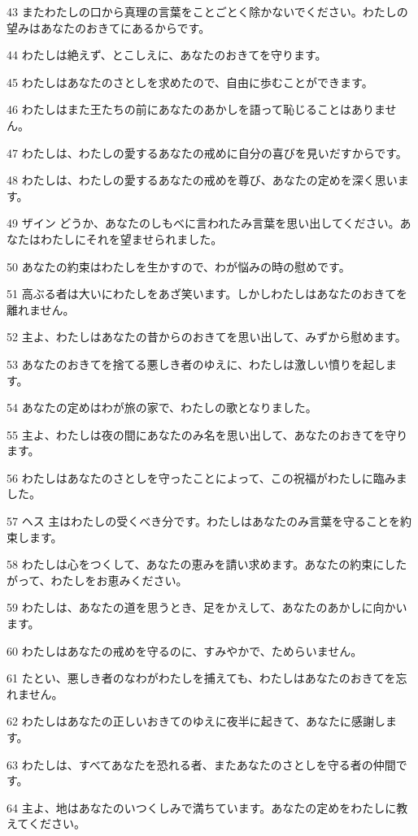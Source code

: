 \par 43 またわたしの口から真理の言葉をことごとく除かないでください。わたしの望みはあなたのおきてにあるからです。
\par 44 わたしは絶えず、とこしえに、あなたのおきてを守ります。
\par 45 わたしはあなたのさとしを求めたので、自由に歩むことができます。
\par 46 わたしはまた王たちの前にあなたのあかしを語って恥じることはありません。
\par 47 わたしは、わたしの愛するあなたの戒めに自分の喜びを見いだすからです。
\par 48 わたしは、わたしの愛するあなたの戒めを尊び、あなたの定めを深く思います。
\par 49 ザイン どうか、あなたのしもべに言われたみ言葉を思い出してください。あなたはわたしにそれを望ませられました。
\par 50 あなたの約束はわたしを生かすので、わが悩みの時の慰めです。
\par 51 高ぶる者は大いにわたしをあざ笑います。しかしわたしはあなたのおきてを離れません。
\par 52 主よ、わたしはあなたの昔からのおきてを思い出して、みずから慰めます。
\par 53 あなたのおきてを捨てる悪しき者のゆえに、わたしは激しい憤りを起します。
\par 54 あなたの定めはわが旅の家で、わたしの歌となりました。
\par 55 主よ、わたしは夜の間にあなたのみ名を思い出して、あなたのおきてを守ります。
\par 56 わたしはあなたのさとしを守ったことによって、この祝福がわたしに臨みました。
\par 57 ヘス 主はわたしの受くべき分です。わたしはあなたのみ言葉を守ることを約束します。
\par 58 わたしは心をつくして、あなたの恵みを請い求めます。あなたの約束にしたがって、わたしをお恵みください。
\par 59 わたしは、あなたの道を思うとき、足をかえして、あなたのあかしに向かいます。
\par 60 わたしはあなたの戒めを守るのに、すみやかで、ためらいません。
\par 61 たとい、悪しき者のなわがわたしを捕えても、わたしはあなたのおきてを忘れません。
\par 62 わたしはあなたの正しいおきてのゆえに夜半に起きて、あなたに感謝します。
\par 63 わたしは、すべてあなたを恐れる者、またあなたのさとしを守る者の仲間です。
\par 64 主よ、地はあなたのいつくしみで満ちています。あなたの定めをわたしに教えてください。
